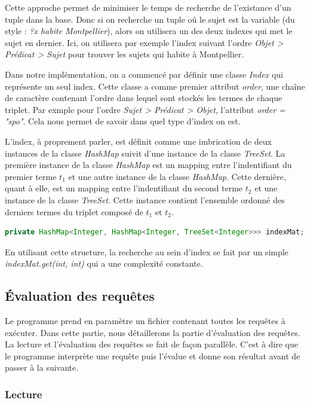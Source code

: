 \documentclass[12pt,titlepage]{article}
\begin{document}
Cette approche permet de minimiser le temps de recherche de l'existance d'un tuple dans la base. Donc si on recherche un tuple oû le sujet est la variable (du style : \textit{?x habite Montpellier}), alors on utilisera un des deux indexes qui met le sujet en dernier. Ici, on utilisera par exemple l'index suivant l'ordre \textit{Objet > Prédicat > Sujet} pour trouver les sujets qui habite à Montpellier.

Dans notre implémentation, on a commencé par définir une classe \textit{Index} qui représente un seul index. Cette classe a comme premier attribut \textit{order}, une chaîne de caractère contenant l'ordre dans lequel sont stockés les termes de chaque triplet. Par exmple pour l'ordre \textit{Sujet > Prédicat > Objet}, l'attribut \textit{order = "spo"}. Cela nous permet de savoir dans quel type d'index on est.

L'index, à proprement parler, est définit comme une imbrication de deux instances de la classe \textit{HashMap} suivit d'une instance de la classe \textit{TreeSet}. La première instance de la classe \textit{HashMap} est un mapping entre l'indentifiant du premier terme \textit{$t_1$} et une autre instance de la classe \textit{HashMap}. Cette dernière, quant à elle, est un mapping entre l'indentifiant du second terme \textit{$t_2$} et une instance de la classe \textit{TreeSet}. Cette instance contient l'ensemble ordonné des derniers termes du triplet composé de $t_1$ et $t_2$.

\begin{lstlisting}[language=Java]
	private HashMap<Integer, HashMap<Integer, TreeSet<Integer>>> indexMat;
\end{lstlisting}

En utilisant cette structure, la recherche au sein d'index se fait par un simple \textit{indexMat.get(int, int)} qui a une complexité constante.

\subsection{Évaluation des requêtes}

Le programme prend en paramètre un fichier contenant toutes les requêtes à exécuter.
Dans cette partie, nous détaillerons la partie d'évaluation des requêtes. La lecture et l'évaluation des requêtes se fait de façon parallèle. C'est à dire que le programme interprète une requête puis l'évalue et donne son résultat avant de passer à la suivante.

\subsubsection{Lecture}
\end{document}
